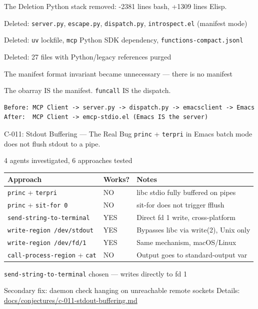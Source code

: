 \documentclass[presentation]{beamer}
\begin{document}
\begin{frame}[label={sec:org2d7b190},fragile]{The Deletion}
 Python stack removed: -2381 lines bash, +1309 lines Elisp.
\begin{block}{Deleted: \texttt{server.py}, \texttt{escape.py}, \texttt{dispatch.py}, \texttt{introspect.el} (manifest mode)}
\end{block}
\begin{block}{Deleted: \texttt{uv} lockfile, \texttt{mcp} Python SDK dependency, \texttt{functions-compact.jsonl}}
\end{block}
\begin{block}{Deleted: 27 files with Python/legacy references purged}
\end{block}
\begin{block}{The manifest format invariant became unnecessary --- there is no manifest}
\end{block}
\begin{block}{The obarray IS the manifest. \texttt{funcall} IS the dispatch.}
\begin{verbatim}
Before: MCP Client -> server.py -> dispatch.py -> emacsclient -> Emacs
After:  MCP Client -> emcp-stdio.el (Emacs IS the server)
\end{verbatim}
\end{block}
\end{frame}
\begin{frame}[label={sec:org1e1587e},fragile]{C-011: Stdout Buffering --- The Real Bug}
 \texttt{princ} + \texttt{terpri} in Emacs batch mode does not flush stdout to a pipe.
\begin{block}{4 agents investigated, 6 approaches tested}
\begin{center}
\begin{tabular}{lll}
Approach & Works? & Notes\\
\hline
\texttt{princ} + \texttt{terpri} & NO & libc stdio fully buffered on pipes\\
\texttt{princ} + \texttt{sit-for 0} & NO & sit-for does not trigger fflush\\
\texttt{send-string-to-terminal} & YES & Direct fd 1 write, cross-platform\\
\texttt{write-region /dev/stdout} & YES & Bypasses libc via write(2), Unix only\\
\texttt{write-region /dev/fd/1} & YES & Same mechanism, macOS/Linux\\
\texttt{call-process-region} + \texttt{cat} & NO & Output goes to standard-output var\\
\end{tabular}
\end{center}
\end{block}
\begin{block}{\texttt{send-string-to-terminal} chosen --- writes directly to fd 1}
\end{block}
\begin{block}{Secondary fix: daemon check hanging on unreachable remote sockets}
Details: \href{../../conjectures/c-011-stdout-buffering.md}{docs/conjectures/c-011-stdout-buffering.md}
\end{block}
\end{frame}
\end{document}
